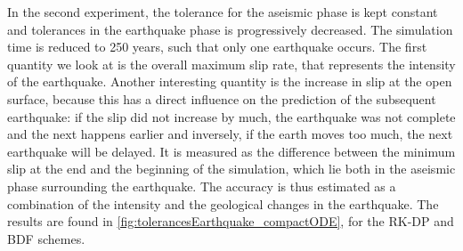 In the second experiment, the tolerance for the aseismic phase is kept constant and tolerances in the earthquake phase is progressively decreased. The simulation time is reduced to 250 years, such that only one earthquake occurs. The first quantity we look at is the overall maximum slip rate, that represents the intensity of the earthquake. Another interesting quantity is the increase in slip at the open surface, because this has a direct influence on the prediction of the subsequent earthquake: if the slip did not increase by much, the earthquake was not complete and the next happens earlier and inversely, if the earth moves too much, the next earthquake will be delayed. It is measured as the difference between the minimum slip at the end and the beginning of the simulation, which lie both in the aseismic phase surrounding the earthquake. The accuracy is thus estimated as a combination of the intensity and the geological changes in the earthquake. The results are found in \autoref{fig:tolerancesEarthquake_compactODE}, for the RK-DP and BDF schemes.

